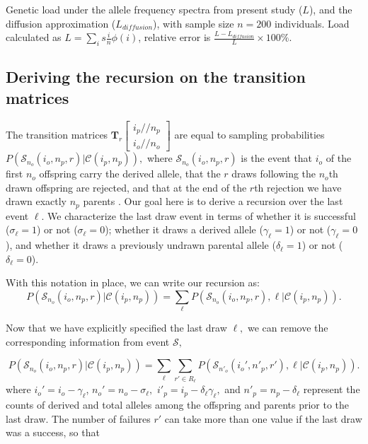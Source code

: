 \documentclass[9pt,twocolumn,twoside,lineno]{gsajnl}
\newcommand{\dslash}{/\!\!/}
\newcommand{\Coalc}[4]{\begin{bmatrix}#1\dslash #2 \\ #3\dslash #4 \end{bmatrix}}
\newcommand{\CC}{\mathcal{C}}
\newcommand{\ms}{\mathcal{S}}
\begin{document}
\begin{table}
    \caption{\label{tab_apx_load} Genetic load under the allele frequency
    spectra from present study ($L$), and the diffusion approximation
    ($L_{diffusion}$), with sample size $n=200$ individuals. Load calculated as
    $L=\sum_i s \frac{i}{n} \phi(i)$, relative error is
    $\frac{L-L_{diffusion}}{L}\times100\%$. }

\end{table}

\subsection{Deriving the recursion on the transition matrices}
\label{subsec_apx_tpm_deriv}

The transition matrices $\mathbf{T}_{r}\Coalc{i_p}{n_p}{i_o}{n_o}$ are equal to sampling
probabilities $P(\ms_{n_o}(i_o, n_p, r) | \CC{(i_p,n_p)} ),$ where $\ms_{n_o}(i_o,n_p, r)$ is the
event that $i_o$ of the first $n_o$ offspring carry the derived allele, that the $r$
draws following the $n_o$th drawn offspring are rejected, and that at the end of the $r$th
rejection we have drawn exactly $n_p$ parents . Our goal here is to derive a recursion
over the last event $\ell$. We characterize the last draw event in terms of whether it is
successful ($\sigma_\ell=1$) or not ($\sigma_\ell=0$); whether it draws a derived allele
($\gamma_\ell=1$) or not ($\gamma_\ell=0$), and whether it draws a previously undrawn parental
allele ($\delta_\ell=1$) or not ($\delta_\ell=0$).

With this notation in place, we can write our recursion as:
 \begin{equation}
  P( \ms_{n_o}(i_o, n_p, r) | \CC{(i_p,n_p)} ) = \sum_\ell P( \ms_{n_o}(i_o, n_p, r),\ell | \CC(i_p,n_p) ) .
 \end{equation}

Now that we have explicitly specified the last draw $\ell,$ we can remove the corresponding
information from event $\ms,$

\begin{equation}
  P(\ms_{n_o}(i_o, n_p, r) | \CC{(i_p,n_p)} ) = \sum_\ell \sum_{r' \in R_\ell} P(\ms_{n'_o}(i_o',
  n'_p, r'),\ell | \CC{(i_p,n_p)} ) .
\end{equation}
where $i_o' = i_o-\gamma_\ell$,  $n_o' = n_o-\sigma_\ell,$ $i'_p= i_p - \delta_\ell \gamma_\ell,$  and $n'_p  = n_p - \delta_\ell$ represent the
counts of derived and total alleles among the offspring and parents prior to the last draw.
 The number of failures $r'$ can take more than one value if the last draw was a success,
so that
\end{document}
